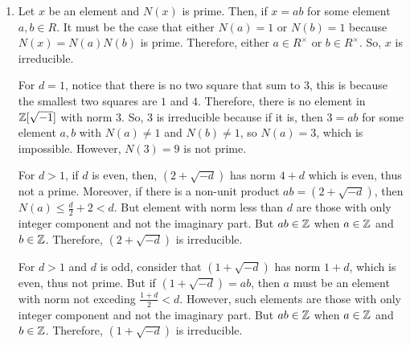 \documentclass{report}
\begin{document}
{\begin{enumerate}
      \item Let $x$ be an element and $N(x)$ is prime. Then, if $x = ab$ for some element $a, b \in R$. It must be the case that either 
        $N(a) = 1$ or $N(b) = 1$ because $N(x) = N(a)N(b)$ is prime. Therefore, either $a \in R^\times$ or $b \in R^\times$. 
        So, $x$ is irreducible.

        For $d = 1$, notice that there is no two square that sum to $3$, this is because the smallest two squares are $1$ and $4$. 
        Therefore, there is no element in $\mathbb{Z}[\sqrt{-1}]$ with norm $3$. So, $3$ is irreducible because if it is, then $3 = ab$ for 
        some element $a, b$ with $N(a) \ne 1$ and $N(b) \ne 1$, so $N(a) = 3$, which is impossible. However, $N(3) = 9$ is not prime. 

        For $d > 1$, if $d$ is even, then, $(2 + \sqrt{-d})$ has norm $4 + d$ which is even, thus not a prime. 
        Moreover, if there is a non-unit product $ab = (2 + \sqrt{-d})$, then $N(a) \le \frac{d}{2} + 2 < d$. 
        But element with norm less than $d$ are those with only integer component and not the imaginary part. 
        But $ab \in \mathbb{Z}$ when $a \in \mathbb{Z}$ and $b \in \mathbb{Z}$. 
        Therefore, $(2 + \sqrt{-d})$ is irreducible. 

        For $d > 1$ and $d$ is odd, consider that $(1 + \sqrt{-d})$ has norm $1 + d$, which is even, thus not prime. 
        But if $(1 + \sqrt{-d}) = ab$, then $a$ must be an element with norm not exceding $\frac{1 + d}{2} < d$.
        However, such elements are those with only integer component and not the imaginary part. 
        But $ab \in \mathbb{Z}$ when $a \in \mathbb{Z}$ and $b \in \mathbb{Z}$. 
        Therefore, $(1 + \sqrt{-d})$ is irreducible. 

    \end{enumerate}
  }
\end{document}
